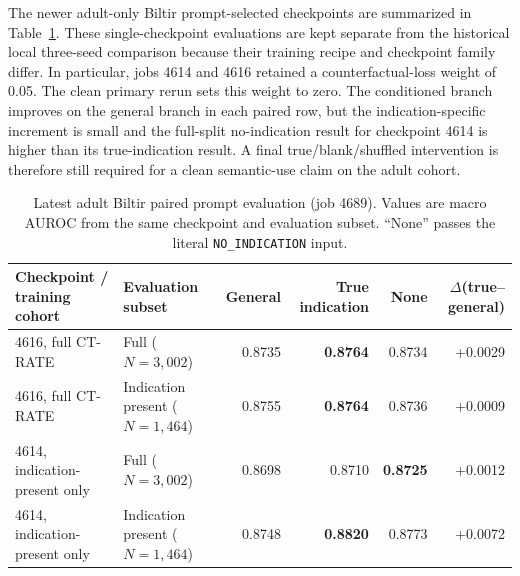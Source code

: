 \documentclass[10pt,twocolumn]{article}
\newcommand{\best}[1]{\textbf{#1}}
\begin{document}
The newer adult-only Biltir prompt-selected checkpoints are summarized in
Table~\ref{tab:biltir-paired}. These single-checkpoint evaluations are kept
separate from the historical local three-seed comparison because their
training recipe and checkpoint family differ. In particular, jobs 4614 and
4616 retained a counterfactual-loss weight of 0.05. The clean primary rerun
sets this weight to zero. The conditioned branch improves on the general
branch in each paired row, but the indication-specific increment is small and
the full-split no-indication result for checkpoint 4614 is higher than its
true-indication result. A final true/blank/shuffled intervention is therefore
still required for a clean semantic-use claim on the adult cohort.

\begin{table}[t]
\centering
\caption{Latest adult Biltir paired prompt evaluation (job 4689). Values are
macro AUROC from the same checkpoint and evaluation subset. ``None'' passes
the literal \texttt{NO\_INDICATION} input.}
\label{tab:biltir-paired}
\begin{tabular}{@{}llrrrr@{}}
\toprule
Checkpoint / training cohort & Evaluation subset & General & True indication & None & $\Delta$(true--general) \\
\midrule
4616, full CT-RATE & Full ($N=3{,}002$) & 0.8735 & \best{0.8764} & 0.8734 & +0.0029 \\
4616, full CT-RATE & Indication present ($N=1{,}464$) & 0.8755 & \best{0.8764} & 0.8736 & +0.0009 \\
4614, indication-present only & Full ($N=3{,}002$) & 0.8698 & 0.8710 & \best{0.8725} & +0.0012 \\
4614, indication-present only & Indication present ($N=1{,}464$) & 0.8748 & \best{0.8820} & 0.8773 & +0.0072 \\
\bottomrule
\end{tabular}
\end{table}
\end{document}
